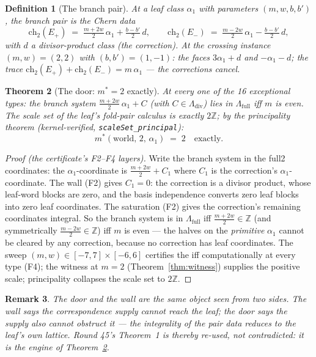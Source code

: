 \documentclass[11pt]{article}
\newtheorem{theorem}{Theorem}
\newtheorem{definition}[theorem]{Definition}
\newtheorem{remark}[theorem]{Remark}
\begin{document}
\begin{definition}[The branch pair]\label{def:branch}
At a leaf class $\alpha_1$ with parameters $(m, w, b, b')$, the \emph{branch pair} is the
Chern data
\[
\mathrm{ch}_2(E_+) \;=\; \tfrac{m + 2w}{2}\,\alpha_1 + \tfrac{b - b'}{2}\,d, \qquad
\mathrm{ch}_2(E_-) \;=\; \tfrac{m - 2w}{2}\,\alpha_1 - \tfrac{b - b'}{2}\,d,
\]
with $d$ a divisor-product class (the correction).  At the crossing instance $(m, w) = (2,2)$
with $(b, b') = (1, -1)$: the faces $3\alpha_1 + d$ and $-\alpha_1 - d$; the trace
$\mathrm{ch}_2(E_+) + \mathrm{ch}_2(E_-) = m\,\alpha_1$ --- the corrections \emph{cancel}.
\end{definition}

\begin{theorem}[The door: $m^* = 2$ exactly]\label{thm:door}
At every one of the 16 exceptional types: the branch system
$\tfrac{m + 2w}{2}\,\alpha_1 + C$ (with $C \in \Lambda_{\mathrm{div}}$) lies in
$\Lambda_{\mathrm{full}}$ \emph{iff} $m$ is even.  The scale set of the leaf's fold-pair
calculus is \emph{exactly} $2\mathbb{Z}$; by the principality theorem (kernel-verified,
\texttt{scaleSet\_principal}):
\[
m^*(\text{world},\, 2,\, \alpha_1) \;=\; 2 \quad \text{exactly.}
\]
\end{theorem}

\begin{proof}[Proof (the certificate's F2--F4 layers)]
Write the branch system in the full2 coordinates: the $\alpha_1$-coordinate is
$\tfrac{m + 2w}{2} + C_1$ where $C_1$ is the correction's $\alpha_1$-coordinate.  The wall (F2)
gives $C_1 = 0$: the correction is a divisor product, whose leaf-word blocks are zero, and the
basis independence converts zero leaf blocks into zero leaf coordinates.  The saturation (F2)
gives the correction's remaining coordinates integral.  So the branch system is in
$\Lambda_{\mathrm{full}}$ iff $\tfrac{m + 2w}{2} \in \mathbb{Z}$ (and symmetrically
$\tfrac{m - 2w}{2} \in \mathbb{Z}$) iff $m$ is even --- the halves on the \emph{primitive}
$\alpha_1$ cannot be cleared by any correction, because no correction has leaf coordinates.  The
sweep $(m, w) \in [-7,7] \times [-6,6]$ certifies the iff computationally at every type (F4);
the witness at $m = 2$ (Theorem~\ref{thm:witness}) supplies the positive scale; principality
collapses the scale set to $2\mathbb{Z}$.
\end{proof}

\begin{remark}
The door and the wall are the same object seen from two sides.  The wall says the
correspondence supply cannot \emph{reach} the leaf; the door says the supply also cannot
\emph{obstruct} it --- the integrality of the pair data reduces to the leaf's own lattice.
Round 45's Theorem~1 is thereby \emph{re-used}, not contradicted: it is the engine of
Theorem~\ref{thm:door}.
\end{remark}
\end{document}
